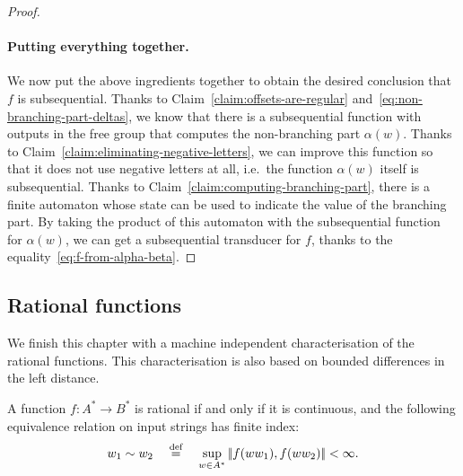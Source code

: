 \begin{proof}
\paragraph*{Putting everything together.} We now put the above ingredients together to obtain the desired conclusion that $f$ is subsequential. Thanks to Claim~\ref{claim:offsets-are-regular} and~\eqref{eq:non-branching-part-deltas}, we know that there is a subsequential function with outputs in the free group that computes the non-branching part $\alpha(w)$. Thanks to Claim~\ref{claim:eliminating-negative-letters}, we can improve this function so that it does not use negative letters at all, i.e.~the function $\alpha(w)$ itself is subsequential. Thanks to Claim~\ref{claim:computing-branching-part}, there is a finite automaton whose state can be used to indicate the value of the branching part. By taking the product of this automaton with the subsequential function for $\alpha(w)$, we can get a subsequential transducer for $f$, thanks to the equality~\eqref{eq:f-from-alpha-beta}.
\end{proof}


\subsection{Rational functions}
\label{sec:machine-independent-rational}
We finish this chapter with  a machine independent characterisation of the rational functions. This characterisation is also based on bounded differences in the left distance.




\begin{theorem}\label{thm:machine-independent-rational-functions}
    A function $f : A^* \to B^*$ is rational if and only if it is continuous, and the following equivalence relation on input strings has finite index:
    \begin{align*}
w_1 \sim w_2 \quad \stackrel{\text{def}}= \quad  \sup_{w \in A^*} |\!| f(w w_1), f(w w_2) |\!| < \infty.
\end{align*}
\end{theorem}

